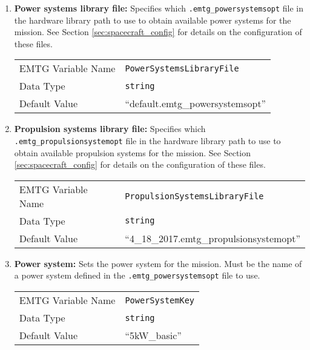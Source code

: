 \begin{enumerate}
    \item \textbf{Power systems library file:} Specifies which {\tt .emtg\_powersystemsopt} file in the hardware library path to use to obtain available power systems for the mission. See Section \ref{sec:spacecraft_config} for details on the configuration of these files.
    \begin{table}[H]
        \hspace{2cm}
        \begin{tabular}{lp{5cm}}
        \ac{EMTG} Variable Name & \verb|PowerSystemsLibraryFile| \\
        Data Type & \verb|string| \\
        Default Value & ``default.emtg\_powersystemsopt'' \\
        \end{tabular}
    \end{table}
    
    \item \textbf{Propulsion systems library file:} Specifies which {\tt .emtg\_propulsionsystemopt} file in the hardware library path to use to obtain available propulsion systems for the mission. See Section \ref{sec:spacecraft_config} for details on the configuration of these files.
    \begin{table}[H]
        \hspace{2cm}
        \begin{tabular}{lp{5cm}}
        \ac{EMTG} Variable Name & \verb|PropulsionSystemsLibraryFile| \\
        Data Type & \verb|string| \\
        Default Value & ``4\_18\_2017.emtg\_propulsionsystemopt'' \\
        \end{tabular}
    \end{table}

    \item \textbf{Power system:} Sets the power system for the mission. Must be the name of a power system defined in the {\tt .emtg\_powersystemsopt} file to use.
    \begin{table}[H]
        \hspace{2cm}
        \begin{tabular}{lp{5cm}}
        \ac{EMTG} Variable Name & \verb|PowerSystemKey| \\
        Data Type & \verb|string| \\
        Default Value & ``5kW\_basic'' \\
        \end{tabular}
    \end{table}
    

\end{enumerate}
